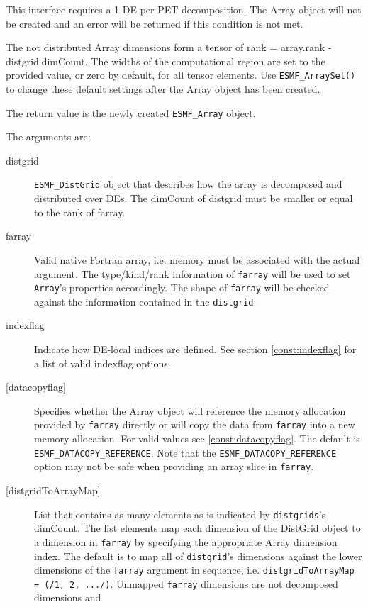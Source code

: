    This interface requires a 1 DE per PET decomposition. The Array object will 
   not be created and an error will be returned if this condition is not met. 
   
   The not distributed Array dimensions form a tensor of rank = array.rank - 
   distgrid.dimCount. The widths of the computational region are set to 
   the provided value, or zero by default, for all tensor elements. Use 
   {\tt ESMF\_ArraySet()} to change these default settings after the 
   Array object has been created. 
   
   The return value is the newly created {\tt ESMF\_Array} object. 
   
   The arguments are: 
   \begin{description} 
   \item[distgrid] 
   {\tt ESMF\_DistGrid} object that describes how the array is decomposed and 
   distributed over DEs. The dimCount of distgrid must be smaller or equal 
   to the rank of farray. 
   \item[farray] 
   Valid native Fortran array, i.e. memory must be associated with the 
   actual argument. The type/kind/rank information of {\tt farray} will be 
   used to set {\tt Array}'s properties accordingly. The shape of 
   {\tt farray} will be checked against the information contained in the 
   {\tt distgrid}. 
   \item[indexflag] 
   Indicate how DE-local indices are defined. See section 
   \ref{const:indexflag} for a list of valid indexflag options. 
   \item[{[datacopyflag]}] 
   Specifies whether the Array object will reference the memory allocation 
   provided by {\tt farray} directly or will copy the data from 
   {\tt farray} into a new memory allocation. For valid values see 
   \ref{const:datacopyflag}. The default is {\tt ESMF\_DATACOPY\_REFERENCE}. 
   Note that the {\tt ESMF\_DATACOPY\_REFERENCE} option may not be safe 
   when providing an array slice in {\tt farray}. 
   \item[{[distgridToArrayMap]}] 
   List that contains as many elements as is indicated by 
   {\tt distgrids}'s dimCount. The list elements map each dimension of 
   the DistGrid object to a dimension in {\tt farray} by specifying the 
   appropriate Array dimension index. The default is to map all of 
   {\tt distgrid}'s dimensions against the lower dimensions of the 
   {\tt farray} argument in sequence, i.e. {\tt distgridToArrayMap = 
   (/1, 2, .../)}. 
   Unmapped {\tt farray} dimensions are not decomposed dimensions and 

\end{description}
